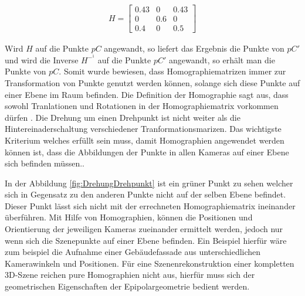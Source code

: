 \begin{gather}
	H = \begin{bmatrix}
		0.43&0&0.43\\
		0&0.6&0\\
		0.4&0&0.5
	\end{bmatrix}
\end{gather}

Wird $H$ auf die Punkte $pC$ angewandt, so liefert das Ergebnis die Punkte von $pC'$ und wird die Inverse $H^{-^1}$ auf die Punkte $pC'$ angewandt, so erhält man die Punkte von $pC$. Somit wurde bewiesen, dass Homographiematrizen immer zur Transformation von Punkte genutzt werden können, solange sich diese Punkte auf einer Ebene im Raum befinden. Die Definition der Homographie sagt aus, dass sowohl Tranlationen und Rotationen in der Homographiematrix vorkommen dürfen \cite{Roser} \cite{Peiffer}. Die Drehung um einen Drehpunkt ist nicht weiter als die Hintereinaderschaltung verschiedener Tranformationsmarizen. Das wichtigste Kriterium welches erfüllt sein muss, damit Homographien angewendet werden können ist, dass die Abbildungen der Punkte in allen Kameras auf einer Ebene sich befinden müssen.\cite{Elements}.

In der Abbildung \ref{fig:DrehungDrehpunkt} ist ein grüner Punkt zu sehen welcher sich in Gegensatz zu den anderen Punkte nicht auf der selben Ebene befindet. Dieser Punkt lässt sich nicht mit der errechneten Homographiematrix ineinander überführen. Mit Hilfe von Homographien, können die Positionen und Orientierung der jeweiligen Kameras zueinander ermittelt werden, jedoch nur wenn sich die Szenepunkte auf einer Ebene befinden. Ein Beispiel hierfür wäre zum beispiel die Aufnahme einer Gebäudefassade aus unterschiedlichen Kamerawinkeln und Positionen\cite{Elements}. Für eine Szenenrekonstruktion einer kompletten 3D-Szene reichen pure Homographien nicht aus, hierfür muss sich der geometrischen Eigenschaften der Epipolargeometrie bedient werden. 

